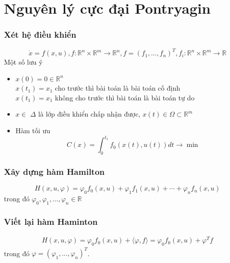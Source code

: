 \documentclass[12pt,a4paper]{report}
\begin{document}
	\section{Nguyên lý cực đại Pontryagin}
	\subsubsection{Xét hệ điều khiển} \begin{equation}
		\dot{x} = f(x, u), f: \mathbb{R}^n \times \mathbb{R}^m \to \mathbb{R}^n, f = (f_1, ..., f_n)^T, f_i: \mathbb{R}^n \times \mathbb{R}^m \to \mathbb{R}
	\end{equation}
	Một số lưu ý
	\begin{itemize}
		\item $x(0) = 0 \in \mathbb{R}^n$ \\ $x(t_1) = x_1$ cho trước thì bài toán là bài toán cố định \\ $x(t_1) = x_1$ không cho trước thì bài toán là bài toán tự do
		\item $x \in$ $\Delta$ là lớp điều khiển chấp nhận được, $x(t) \in \Omega \subset \mathbb{R}^m$
		\item Hàm tối ưu \begin{equation}
			C(x) = \int_{0}^{t_1}f_0(x(t), u(t))dt \to \min \nonumber
		\end{equation}
	\end{itemize}
	\subsubsection{Xây dựng hàm Hamilton}
	\begin{equation}
		H(x, u, \varphi) = \varphi_0f_0(x, u) + \varphi_1f_1(x, u) + \cdots + \varphi_nf_n(x, u)
	\end{equation} trong đó $\varphi_0, \varphi_1, ..., \varphi_n \in \mathbb{R}$
	\subsubsection{Viết lại hàm Haminton}
	\begin{eqnarray}
		H(x, u, \varphi) = \varphi_0f_0(x, u) + \langle \varphi, f \rangle = \varphi_0f_0(x, u) + \varphi^Tf 
	\end{eqnarray} trong đó $\varphi = (\varphi_1,...,\varphi_n)^T$.
	
\end{document}
